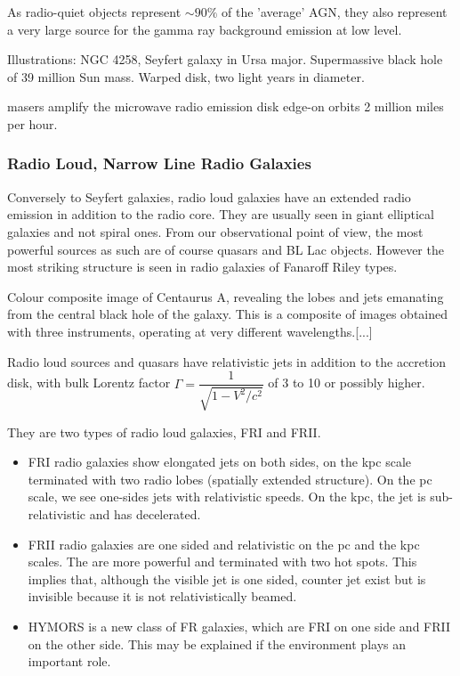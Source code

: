 \documentclass[10pt,a4paper,english,draft]{article}
\begin{document}
As radio-quiet objects represent $\sim 90 \% $ of the 'average' AGN, they also
represent a very large source for the gamma ray background emission at low
level.

Illustrations: NGC 4258, Seyfert galaxy in Ursa major. Supermassive black hole
of 39 million Sun mass. Warped disk, two light years in diameter.

 masers amplify the microwave radio emission disk edge-on orbits 2 million
miles per hour.

\subsubsection{Radio Loud, Narrow Line Radio Galaxies}

Conversely to Seyfert galaxies, radio loud galaxies have an extended radio
emission in addition to the radio core. They are usually seen in giant
elliptical galaxies and not spiral ones. From our observational point of view,
the most powerful sources as such are of course quasars and BL Lac objects.
However the most striking structure is seen in radio galaxies of Fanaroff Riley
types.

Colour composite image of Centaurus A, revealing the lobes and jets emanating
from the central black hole of the galaxy. This is a composite of images
obtained with three instruments, operating at very different wavelengths.[...]

Radio loud sources and quasars have relativistic jets in addition to the
accretion disk, with bulk Lorentz factor $\Gamma=\dfrac{1}{\sqrt{1-V^2/c^2}}$
of 3 to 10 or possibly higher.

They are two types of radio loud galaxies, FRI and FRII.
\begin{itemize}
    \item FRI radio galaxies show elongated jets on both sides, on the kpc
          scale terminated with two radio lobes (spatially extended structure).
          On the pc scale, we see one-sides jets with relativistic speeds. On
          the kpc, the jet is sub-relativistic and has decelerated.
    \item FRII radio galaxies are one sided and relativistic on the pc and the
          kpc scales. The are more powerful and terminated with two hot spots.
          This implies that, although the visible jet is one sided, counter jet
          exist but is invisible because it is not relativistically beamed.
    \item HYMORS is a new class of FR galaxies, which are FRI on one side and
          FRII on the other side. This may be explained if the environment
          plays an important role.
\end{itemize}
\end{document}
